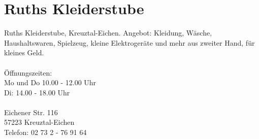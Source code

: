 \section{Ruths Kleiderstube}
Ruths Kleiderstube, Kreuztal-Eichen. Angebot: Kleidung, Wäsche, Haushaltswaren, Spielzeug, kleine Elektrogeräte und mehr aus zweiter Hand, für kleines Geld. \\
\\
Öffnungszeiten: \\
Mo und Do 10.00 - 12.00 Uhr \\
Di: 14.00 - 18.00 Uhr \\
\\
Eichener Str. 116 \\
57223 Kreuztal-Eichen\\
Telefon: 02 73 2 - 76 91 64